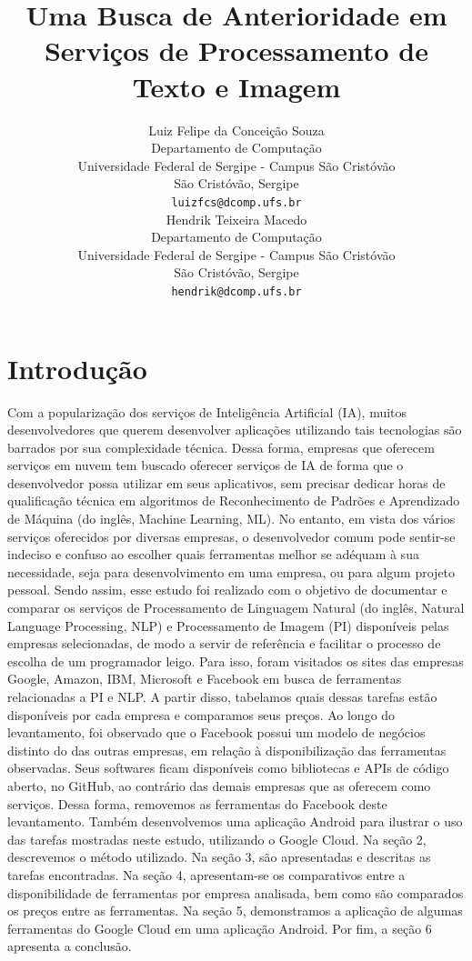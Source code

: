 \documentclass{article}
\title{Uma Busca de Anterioridade em Serviços de Processamento de Texto e Imagem}
\author{
  Luiz Felipe da Conceição Souza \\
  Departamento de Computação\\
  Universidade Federal de Sergipe - Campus São Cristóvão\\
  São Cristóvão, Sergipe \\
  \texttt{luizfcs@dcomp.ufs.br} \\
   \And
 Hendrik Teixeira Macedo \\
  Departamento de Computação\\
 Universidade Federal de Sergipe - Campus São Cristóvão\\
  São Cristóvão, Sergipe \\
  \texttt{hendrik@dcomp.ufs.br} \\
}
\begin{document}
\maketitle

\begin{abstract}
\lipsum[1]
\end{abstract}


\section{Introdução}
Com a popularização dos serviços de Inteligência Artificial (IA), muitos desenvolvedores que querem desenvolver aplicações utilizando tais tecnologias são barrados por sua  complexidade técnica. Dessa forma, empresas que oferecem serviços em nuvem tem buscado oferecer serviços de IA de forma que o desenvolvedor possa utilizar em seus aplicativos, sem precisar dedicar horas de qualificação técnica em algoritmos de Reconhecimento de Padrões e Aprendizado de Máquina (do inglês, Machine Learning, ML). No entanto, em vista dos vários serviços oferecidos por diversas empresas, o desenvolvedor comum pode sentir-se indeciso e confuso ao escolher quais ferramentas melhor se adéquam à sua necessidade, seja para desenvolvimento em uma empresa, ou para algum projeto pessoal. Sendo assim, esse estudo foi realizado com o objetivo de documentar e comparar os serviços de Processamento de Linguagem Natural (do inglês, Natural Language Processing, NLP) e Processamento de Imagem (PI) disponíveis pelas empresas selecionadas, de modo a servir de referência e facilitar o processo de escolha de um programador leigo. Para isso, foram visitados os sites das empresas Google, Amazon, IBM, Microsoft e Facebook em busca de ferramentas relacionadas a PI e NLP. A partir disso, tabelamos quais dessas tarefas estão disponíveis por cada empresa e comparamos seus preços. Ao longo do levantamento, foi observado que o Facebook possui um modelo de negócios distinto do das outras empresas, em relação à disponibilização das ferramentas observadas. Seus softwares ficam disponíveis como bibliotecas e APIs de código aberto, no GitHub, ao contrário das demais empresas que as oferecem como serviços. Dessa forma, removemos as ferramentas do Facebook deste levantamento. Também desenvolvemos uma aplicação Android para ilustrar o uso das tarefas mostradas neste estudo, utilizando o Google Cloud. Na seção 2, descrevemos o método utilizado. Na seção 3, são apresentadas e descritas as tarefas encontradas. Na seção 4, apresentam-se os comparativos entre a disponibilidade de ferramentas por empresa analisada, bem como são comparados os preços entre as ferramentas. Na seção 5, demonstramos a aplicação de algumas ferramentas do Google Cloud em uma aplicação Android. Por fim, a seção 6 apresenta a conclusão.
\end{document}
